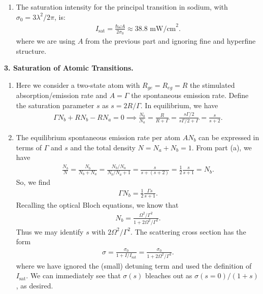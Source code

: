 \documentclass{article}
\theoremstyle{definition}
\newcommand{\f}[2]{\frac{#1}{#2}}
\begin{document}
\begin{enumerate}[label=(\alph*)]
	\item The saturation intensity for the principal transition in sodium, with $\sigma_0 = 3\lambda^2/2\pi$, is:
	\begin{align*}
	I_{\text{sat}} = \f{\hbar \omega A}{2\sigma_0}  \approx 38.8 \text{ mW/cm}^2.
	\end{align*}
	where we are using $A$ from the previous part and ignoring fine and hyperfine structure. 
	
\end{enumerate}


\textbf{3. Saturation of Atomic Transitions.}

\begin{enumerate}[label=(\alph*)]
	\item Here we consider a two-state atom with $R_{ge} = R_{eg} = R$ the stimulated absorption/emission rate and $A = \Gamma$ the spontaneous emission rate. Define the saturation parameter $s$ as $s = 2R/\Gamma$. In equilibrium, we have
	\begin{align*}
	\Gamma N_b + R N_b   - R N_a  = 0 \implies \f{N_b}{N_a} = \f{R}{R+\Gamma} = \f{s\Gamma/2}{s\Gamma/2 + \Gamma} =  \f{s}{s+2}.
	\end{align*}
	
	\item The equilibrium spontaneous emission rate per atom $A N_b$ can be expressed in terms of $\Gamma$ and $s$ and the total density $N = N_a + N_b = 1$. From part (a), we have 
	\begin{align*}
	\f{N_b}{N} = \f{N_b}{N_b + N_a} = \f{N_b/N_a}{N_b/N_a + 1} = \f{s}{s + (s+2)} = \f{1}{2} \f{s}{s+1} = N_b.
	\end{align*}
	So, we find 
	\begin{align*}
	\Gamma N_b = \f{1}{2} \f{\Gamma s}{s+1}.
	\end{align*}
	Recalling the optical Bloch equations, we know that
	\begin{align*}
	N_b = \f{\Omega^2/\Gamma^2}{1 +2\Omega^2/\Gamma^2}. 
	\end{align*}
	Thus we may identify $s$ with $2\Omega^2/\Gamma^2$. The scattering cross section has the form 
	\begin{align*}
	\sigma = \f{\sigma_0}{1 + I/I_\text{sat}} = \f{\sigma_0}{1 + 2\Omega^2/\Gamma^2}.
	\end{align*}
	where we have ignored the (small) detuning term and used the definition of $I_\text{sat}$. We can immediately see that $\sigma(s)$ bleaches out as $\sigma(s=0)/(1+s)$, as desired. 
	

\end{enumerate}
\end{document}
